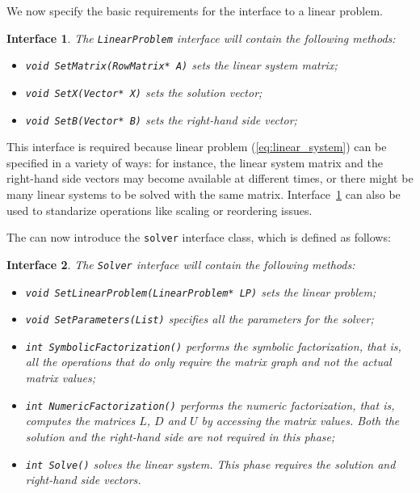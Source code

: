 \documentclass[acmtocl]{acmtrans2m}
\newtheorem{interface}{Interface}[section]
\begin{document}
We now specify the basic requirements for the interface to a linear problem.
\begin{interface}
\label{int:lp}
The {\tt LinearProblem} interface
will contain the following methods:
\begin{itemize}
\item \verb!void SetMatrix(RowMatrix* A)! sets the linear system matrix;
\item \verb!void SetX(Vector* X)! sets the solution vector;
\item \verb!void SetB(Vector* B)! sets the right-hand side vector;
\end{itemize}
\end{interface}
This interface is required because linear problem (\ref{eq:linear_system}) can
be specified in a variety of ways: for instance,
the linear system matrix and the right-hand side vectors may become
available at different times, or
there might be many linear systems to be solved with the same matrix.
Interface~\ref{int:lp} can also be used to standarize operations like
scaling or reordering issues.



\smallskip

The can now introduce the {\tt solver} interface class, which is defined as
follows:
\begin{interface}
\label{int:asi}
The {\tt Solver} interface
will contain the following methods:
\begin{itemize}
\item \verb!void SetLinearProblem(LinearProblem* LP)! sets the linear problem;
\item \verb!void SetParameters(List)! specifies all the parameters for the solver;
\item \verb!int SymbolicFactorization()! performs the symbolic factorization, that
is, all the operations that do only require the matrix graph and not the
actual matrix values;
\item \verb!int NumericFactorization()! performs the numeric factorization, that
is, computes the matrices $L$, $D$ and $U$ by accessing the matrix values.
Both the solution and the right-hand side are not required in this phase;
\item \verb!int Solve()! solves the linear system. This phase requires the
solution and right-hand side vectors.
\end{itemize}
\end{interface}
\end{document}
